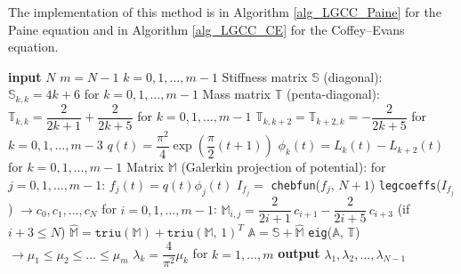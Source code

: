 \documentclass[11pt,a4paper,oneside,openright]{report} %
\begin{document}
The implementation of this method is in Algorithm \ref{alg_LGCC_Paine} for the Paine equation and in Algorithm \ref{alg_LGCC_CE} for the Coffey--Evans equation.

\begin{algorithm}[H]
\caption{Legendre--Galerkin--Chebyshev Collocation - Paine equation}
\label{alg_LGCC_Paine}
{\small
\begin{algorithmic}[1]
\State \textbf{input} $N$
\State $m = N - 1$
\State $k=0,1,\dots,m-1$
\BlankLine
\State Stiffness matrix $\mathbb{S}$ (diagonal):
\State \quad $\mathbb{S}_{k, k} = 4 k + 6$ \quad for $k = 0,1, \dots, m-1$
\BlankLine
\State Mass matrix $\mathbb{T}$ (penta-diagonal):
\State \quad $\mathbb{T}_{k,k} = \dfrac{2}{2 k+1} + \dfrac{2}{2 k+5}$ \quad for $k = 0,1, \dots, m-1$
\State \quad $\mathbb{T}_{k,k+2} = \mathbb{T}_{k+2, k} = -\dfrac{2}{2 k+5}$ \quad for $k = 0,1, \dots, m-3$
\BlankLine
\State \quad $q(t) = \dfrac{\pi^2}{4} \exp\left( \dfrac{\pi}{2} (t + 1) \right)$
\State \quad $\phi_k(t) = L_{k}(t) - L_{k+2}(t)$ \quad for $k = 0,1, \dots, m-1$
\BlankLine
\State Matrix $\mathbb{M}$ (Galerkin projection of potential):
\State \quad for $j = 0,1, \dots, m-1$:
\State \quad \quad $f_j(t) = q(t) \phi_j(t)$
\State \quad \quad $I_{f_j} =$ \texttt{chebfun}($f_j$, $N+1$) 
\State \quad \quad \texttt{legcoeffs}($I_{f_j}$) $ \to c_0, c_1, \dots, c_N$
\State \quad \quad for $i = 0,1, \dots, m-1$:
\State \quad \quad \quad $\mathbb{M}_{i,j} = \dfrac{2}{2 i+1} \, c_{i+1} - \dfrac{2}{2 i+5} \, c_{i+3} $ \quad (if $i+3 \leq N$)
\BlankLine
\State $\mathbb{\hat{M}} = \texttt{triu}(\mathbb{M}) + \texttt{triu}(\mathbb{M}, \, 1)^T$
\State $\mathbb{A} = \mathbb{S} + \mathbb{\hat{M}}$
\BlankLine
\State \texttt{eig}($\mathbb{A}$, $\mathbb{T}$) $ \to \mu_1 \leq \mu_2 \leq \dots \leq \mu_m $
\State$\lambda_k = \dfrac{4}{\pi^2} \mu_k$ \quad for $k = 1, \dots, m$
\State \textbf{output} $\lambda_1, \lambda_2, \dots, \lambda_{N-1}$
\end{algorithmic}
}
\end{algorithm}
\end{document}
